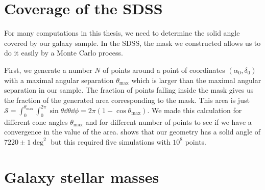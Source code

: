 \section{Coverage of the SDSS}

For many computations in this thesis, we need to determine the solid angle
covered by our galaxy sample. In the SDSS, the mask we constructed allows us to
do it easily by a Monte Carlo process.

First, we generate a number $N$ of points around a point of coordinates
$(\alpha_0, \delta_0)$ with a maximal angular separation $\theta_{\max}$ which
is larger than the maximal angular separation in our sample. The fraction of
points falling inside the mask gives us the fraction of the generated area
corresponding to the mask. This area is just
$\mathcal{S}=\int_0^{\theta_{\max}}\int_0^{2\pi}\sin\theta\dd{\theta}\dd{\phi}=
2\pi\left(1-\cos\theta_{\max}\right)$. We made this calculation for different
cone angles $\theta_{\max}$ and for different number of points to see if we
have a convergence in the value of the area.  shows
that our geometry has a solid angle of $7220\pm1 \mathrm{\deg}^2$ but this
required five simulations with $10^8$ points.
%

\section{Galaxy stellar masses}

